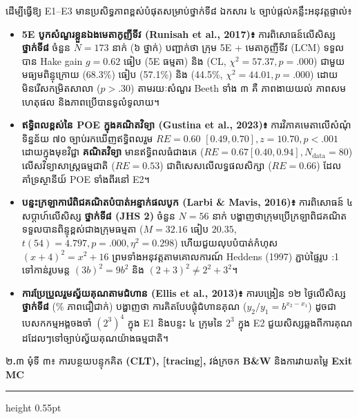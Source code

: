 \documentclass[a4paper,12pt]{article}
\newcommand{\en}[1]{{\TimesEn #1}}
\newcommand{\enbf}[1]{{\TimesEn\textbf{#1}}}
\newcommand{\subsectitle}[1]{{\muol\fontsize{11.5pt}{18.5pt}\selectfont #1}}
\newcommand{\subsec}[1]{%
  \Needspace{1.7cm}%
  \vspace{3pt}%
  \subsectitle{#1}\par%
  \vspace{-2pt}%
  {\color{black}\hrule height 0.55pt}%
  \vspace{3pt}%
}
\begin{document}
ដើម្បីធ្វើឱ្យ \en{E1--E3} មានប្រសិទ្ធភាពខ្ពស់បំផុតសម្រាប់ថ្នាក់ទី៨ ឯកសារ ៤ ច្បាប់ផ្ដល់គន្លឹះអនុវត្តផ្ទាល់៖
\begin{itemize}[leftmargin=0.65cm]
  \item \textbf{\en{5E} បូកសំណួរខ្លួនឯងមេតាកូញីទីវ (\en{Runisah et al., 2017})៖} ការពិសោធន៍លើសិស្ស \textbf{ថ្នាក់ទី៨} ចំនួន \en{$N = 173$} នាក់ (៦ ថ្នាក់) បញ្ជាក់ថា ក្រុម \en{5E} + មេតាកូញីទីវ \en{(LCM)} ទទួលបាន \en{Hake gain $g = 0.62$} ធៀប \en{0.49} (\en{5E} ធម្មតា) និង \en{0.34} (\en{CL}, \en{$\chi^2 = 57.37, p = .000$}) ជាមួយមធ្យមពិន្ទុក្រោយ \en{27.30 (68.3\%)} ធៀប \en{22.84 (57.1\%)} និង \en{17.80 (44.5\%, $\chi^2 = 44.01, p = .000$)} ដោយមិនរើសកម្រិតសាលា (\en{$p > .30$}) តាមរយៈសំណួរ \en{Beeth} ទាំង ៣ គឺ ភាពងាយយល់ ភាពសមហេតុផល និងភាពប្រើបានទូលំទូលាយ។
  \item \textbf{ឥទ្ធិពលខ្ពស់នៃ \en{POE} ក្នុងគណិតវិទ្យា (\en{Gustina et al., 2023})៖} ការវិភាគមេតាលើសំណុំទិន្នន័យ ៧០ ច្បាប់រកឃើញឥទ្ធិពលរួម \en{$RE = 0.60$ $[0.49, 0.70], z = 10.70, p < .001$} ដោយក្នុងមុខវិជ្ជា \textbf{គណិតវិទ្យា} មានឥទ្ធិពលធំជាងគេ (\en{$RE = 0.67 [0.40, 0.94], N_{\text{data}} = 80$}) លើសវិទ្យាសាស្ត្រធម្មជាតិ (\en{$RE = 0.53$}) ជាពិសេសលើលទ្ធផលសិក្សា (\en{$RE = 0.66$}) ដែលគាំទ្រស្ថានីយ៍ \en{POE} ទាំងពីរនៅ \en{E2}។
  \item \textbf{បន្ទះក្រឡាការ៉េពិជគណិតបំបាត់អន្ទាក់ផលបូក (\en{Larbi \& Mavis, 2016})៖} ការពិសោធន៍ ៤ សប្ដាហ៍លើសិស្ស \textbf{ថ្នាក់ទី៨ (\en{JHS 2})} ចំនួន \en{$N = 56$} នាក់ បង្ហាញថាក្រុមប្រើក្រឡាពិជគណិតទទួលបានពិន្ទុខ្ពស់ជាងក្រុមធម្មតា (\en{$M = 32.16$} ធៀប \en{$20.35$}, \en{$t(54) = 4.797, p = .000, \eta^2 = 0.298$}) ហើយជួយលុបបំបាត់កំហុស $(x+4)^2 = x^2+16$ ព្រមទាំងអនុវត្តតាមគោលការណ៍ \en{Heddens (1997)} ភ្ជាប់ផ្ទៃរូប \en{1:1} ទៅកាន់រូបមន្ត $(3b)^2=9b^2$ និង $(2+3)^2\neq 2^2+3^2$។
  \item \textbf{ការប្រែប្រួលរួមស្វ័យគុណតាមជំហាន (\en{Ellis et al., 2013})៖} ការបង្រៀន ១២ ថ្ងៃលើសិស្ស \textbf{ថ្នាក់ទី៨} (\en{92\%} ភាពជឿជាក់) បង្ហាញថា ការគិតបែបផ្ដុំជំហានគុណ (\en{$y_2/y_1 = b^{x_2-x_1}$}) ដូចជាបេសកកម្មអង្គចងចាំ $(2^3)^4$ ក្នុង \en{E1} និងបន្ទះ ៤ ក្រុមនៃ $2^3$ ក្នុង \en{E2} ជួយសិស្សឆ្លងពីការគុណដដែលៗទៅច្បាប់ស្វ័យគុណយ៉ាងធម្មជាតិ។
\end{itemize}

\subsec{២\enbf{.}៣ មុំទី ៣៖ ការបន្ថយបន្ទុកគិត \enbf{(CLT), [tracing],} វង់ក្រចក \enbf{B\&W} និងការវាយតម្លៃ \enbf{Exit MC}}
\end{document}
